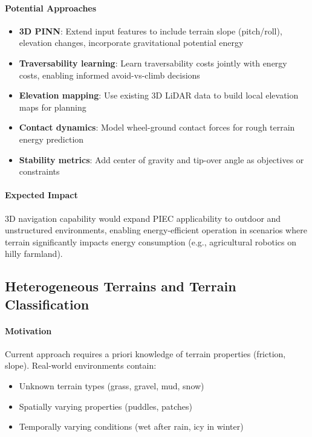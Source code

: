 \paragraph{Potential Approaches}
\begin{itemize}
    \item \textbf{3D PINN}: Extend input features to include terrain slope (pitch/roll), elevation changes, incorporate gravitational potential energy
    \item \textbf{Traversability learning}: Learn traversability costs jointly with energy costs, enabling informed avoid-vs-climb decisions
    \item \textbf{Elevation mapping}: Use existing 3D LiDAR data to build local elevation maps for planning
    \item \textbf{Contact dynamics}: Model wheel-ground contact forces for rough terrain energy prediction
    \item \textbf{Stability metrics}: Add center of gravity and tip-over angle as objectives or constraints
\end{itemize}

\paragraph{Expected Impact}
3D navigation capability would expand PIEC applicability to outdoor and unstructured environments, enabling energy-efficient operation in scenarios where terrain significantly impacts energy consumption (e.g., agricultural robotics on hilly farmland).

\subsection{Heterogeneous Terrains and Terrain Classification}

\paragraph{Motivation}
Current approach requires a priori knowledge of terrain properties (friction, slope). Real-world environments contain:
\begin{itemize}
    \item Unknown terrain types (grass, gravel, mud, snow)
    \item Spatially varying properties (puddles, patches)
    \item Temporally varying conditions (wet after rain, icy in winter)
\end{itemize}

